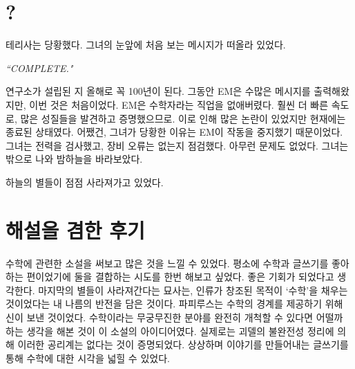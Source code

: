 \documentclass[9pt,showtrims,twoside,openright,chapter]{oblivoir}
\begin{document}
\chapter{?}

 테리사는 당황했다. 그녀의 눈앞에 처음 보는 메시지가 떠올라 있었다.
 \\ \par
 \textit{“COMPLETE."}
 \\ \par
 연구소가 설립된 지 올해로 꼭 100년이 된다. 그동안 EM은 수많은 메시지를 출력해왔지만, 이번 것은 처음이었다. EM은 수학자라는 직업을 없애버렸다. 훨씬 더 빠른 속도로, 많은 성질들을 발견하고 증명했으므로. 이로 인해 많은 논란이 있었지만 현재에는 종료된 상태였다.
어쨌건, 그녀가 당황한 이유는 EM이 작동을 중지했기 때문이었다. 그녀는 전력을 검사했고, 장비 오류는 없는지 점검했다. 아무런 문제도 없었다. 그녀는 밖으로 나와 밤하늘을 바라보았다. 
\\ \par
 하늘의 별들이 점점 사라져가고 있었다. 
\chapter*{해설을 겸한 후기}

수학에 관련한 소설을 써보고 많은 것을 느낄 수 있었다.
평소에 수학과 글쓰기를 좋아하는 편이었기에 둘을 결합하는 시도를 한번 해보고 싶었다. 좋은 기회가 되었다고 생각한다. 마지막의 별들이 사라져간다는 묘사는, 인류가 창조된 목적이 ‘수학’을 채우는 것이었다는 내 나름의 반전을 담은 것이다. 파피루스는 수학의 경계를 제공하기 위해 신이 보낸 것이었다. 수학이라는 무궁무진한 분야를 완전히 개척할 수 있다면 어떨까 하는 생각을 해본 것이 이 소설의 아이디어였다. 실제로는 괴델의 불완전성 정리에 의해 이러한 공리계는 없다는 것이 증명되었다. 상상하며 이야기를 만들어내는 글쓰기를 통해 수학에 대한 시각을 넓힐 수 있었다.
\end{document}
